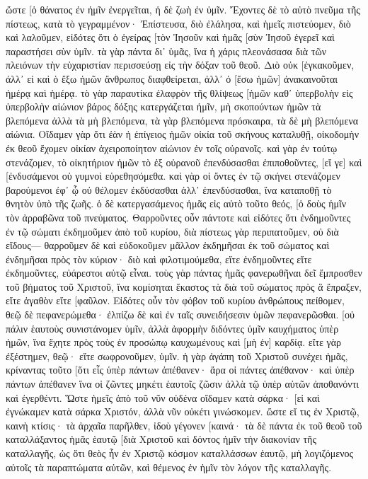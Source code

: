 ὥστε [ὁ θάνατος ἐν ἡμῖν ἐνεργεῖται, ἡ δὲ ζωὴ ἐν ὑμῖν. 
Ἔχοντες δὲ τὸ αὐτὸ πνεῦμα τῆς πίστεως, κατὰ τὸ γεγραμμένον· Ἐπίστευσα, διὸ ἐλάλησα, καὶ ἡμεῖς πιστεύομεν, διὸ καὶ λαλοῦμεν, 
εἰδότες ὅτι ὁ ἐγείρας [τὸν Ἰησοῦν καὶ ἡμᾶς [σὺν Ἰησοῦ ἐγερεῖ καὶ παραστήσει σὺν ὑμῖν. 
τὰ γὰρ πάντα δι᾽ ὑμᾶς, ἵνα ἡ χάρις πλεονάσασα διὰ τῶν πλειόνων τὴν εὐχαριστίαν περισσεύσῃ εἰς τὴν δόξαν τοῦ θεοῦ. 
Διὸ οὐκ [ἐγκακοῦμεν, ἀλλ᾽ εἰ καὶ ὁ ἔξω ἡμῶν ἄνθρωπος διαφθείρεται, ἀλλ᾽ ὁ [ἔσω ἡμῶν] ἀνακαινοῦται ἡμέρᾳ καὶ ἡμέρᾳ. 
τὸ γὰρ παραυτίκα ἐλαφρὸν τῆς θλίψεως [ἡμῶν καθ᾽ ὑπερβολὴν εἰς ὑπερβολὴν αἰώνιον βάρος δόξης κατεργάζεται ἡμῖν, 
μὴ σκοπούντων ἡμῶν τὰ βλεπόμενα ἀλλὰ τὰ μὴ βλεπόμενα, τὰ γὰρ βλεπόμενα πρόσκαιρα, τὰ δὲ μὴ βλεπόμενα αἰώνια. 
Οἴδαμεν γὰρ ὅτι ἐὰν ἡ ἐπίγειος ἡμῶν οἰκία τοῦ σκήνους καταλυθῇ, οἰκοδομὴν ἐκ θεοῦ ἔχομεν οἰκίαν ἀχειροποίητον αἰώνιον ἐν τοῖς οὐρανοῖς. 
καὶ γὰρ ἐν τούτῳ στενάζομεν, τὸ οἰκητήριον ἡμῶν τὸ ἐξ οὐρανοῦ ἐπενδύσασθαι ἐπιποθοῦντες, 
[εἴ γε] καὶ [ἐνδυσάμενοι οὐ γυμνοὶ εὑρεθησόμεθα. 
καὶ γὰρ οἱ ὄντες ἐν τῷ σκήνει στενάζομεν βαρούμενοι ἐφ᾽ ᾧ οὐ θέλομεν ἐκδύσασθαι ἀλλ᾽ ἐπενδύσασθαι, ἵνα καταποθῇ τὸ θνητὸν ὑπὸ τῆς ζωῆς. 
ὁ δὲ κατεργασάμενος ἡμᾶς εἰς αὐτὸ τοῦτο θεός, [ὁ δοὺς ἡμῖν τὸν ἀρραβῶνα τοῦ πνεύματος. 
Θαρροῦντες οὖν πάντοτε καὶ εἰδότες ὅτι ἐνδημοῦντες ἐν τῷ σώματι ἐκδημοῦμεν ἀπὸ τοῦ κυρίου, 
διὰ πίστεως γὰρ περιπατοῦμεν, οὐ διὰ εἴδους— 
θαρροῦμεν δὲ καὶ εὐδοκοῦμεν μᾶλλον ἐκδημῆσαι ἐκ τοῦ σώματος καὶ ἐνδημῆσαι πρὸς τὸν κύριον· 
διὸ καὶ φιλοτιμούμεθα, εἴτε ἐνδημοῦντες εἴτε ἐκδημοῦντες, εὐάρεστοι αὐτῷ εἶναι. 
τοὺς γὰρ πάντας ἡμᾶς φανερωθῆναι δεῖ ἔμπροσθεν τοῦ βήματος τοῦ Χριστοῦ, ἵνα κομίσηται ἕκαστος τὰ διὰ τοῦ σώματος πρὸς ἃ ἔπραξεν, εἴτε ἀγαθὸν εἴτε [φαῦλον. 
Εἰδότες οὖν τὸν φόβον τοῦ κυρίου ἀνθρώπους πείθομεν, θεῷ δὲ πεφανερώμεθα· ἐλπίζω δὲ καὶ ἐν ταῖς συνειδήσεσιν ὑμῶν πεφανερῶσθαι. 
[οὐ πάλιν ἑαυτοὺς συνιστάνομεν ὑμῖν, ἀλλὰ ἀφορμὴν διδόντες ὑμῖν καυχήματος ὑπὲρ ἡμῶν, ἵνα ἔχητε πρὸς τοὺς ἐν προσώπῳ καυχωμένους καὶ [μὴ ἐν] καρδίᾳ. 
εἴτε γὰρ ἐξέστημεν, θεῷ· εἴτε σωφρονοῦμεν, ὑμῖν. 
ἡ γὰρ ἀγάπη τοῦ Χριστοῦ συνέχει ἡμᾶς, κρίναντας τοῦτο [ὅτι εἷς ὑπὲρ πάντων ἀπέθανεν· ἄρα οἱ πάντες ἀπέθανον· 
καὶ ὑπὲρ πάντων ἀπέθανεν ἵνα οἱ ζῶντες μηκέτι ἑαυτοῖς ζῶσιν ἀλλὰ τῷ ὑπὲρ αὐτῶν ἀποθανόντι καὶ ἐγερθέντι. 
Ὥστε ἡμεῖς ἀπὸ τοῦ νῦν οὐδένα οἴδαμεν κατὰ σάρκα· [εἰ καὶ ἐγνώκαμεν κατὰ σάρκα Χριστόν, ἀλλὰ νῦν οὐκέτι γινώσκομεν. 
ὥστε εἴ τις ἐν Χριστῷ, καινὴ κτίσις· τὰ ἀρχαῖα παρῆλθεν, ἰδοὺ γέγονεν [καινά· 
τὰ δὲ πάντα ἐκ τοῦ θεοῦ τοῦ καταλλάξαντος ἡμᾶς ἑαυτῷ [διὰ Χριστοῦ καὶ δόντος ἡμῖν τὴν διακονίαν τῆς καταλλαγῆς, 
ὡς ὅτι θεὸς ἦν ἐν Χριστῷ κόσμον καταλλάσσων ἑαυτῷ, μὴ λογιζόμενος αὐτοῖς τὰ παραπτώματα αὐτῶν, καὶ θέμενος ἐν ἡμῖν τὸν λόγον τῆς καταλλαγῆς. 
